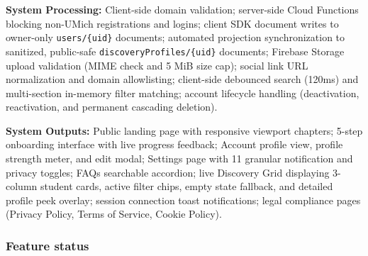 \documentclass[11pt,letterpaper]{article}
\begin{document}
\textbf{System Processing:} Client-side domain validation; server-side Cloud Functions blocking non-UMich registrations and logins; client SDK document writes to owner-only \texttt{users/\{uid\}} documents; automated projection synchronization to sanitized, public-safe \texttt{discoveryProfiles/}\allowbreak\texttt{\{uid\}} documents; Firebase Storage upload validation (MIME check and 5 MiB size cap); social link URL normalization and domain allowlisting; client-side debounced search (120ms) and multi-section in-memory filter matching; account lifecycle handling (deactivation, reactivation, and permanent cascading deletion).

\textbf{System Outputs:} Public landing page with responsive viewport chapters; 5-step onboarding interface with live progress feedback; Account profile view, profile strength meter, and edit modal; Settings page with 11 granular notification and privacy toggles; FAQs searchable accordion; live Discovery Grid displaying 3-column student cards, active filter chips, empty state fallback, and detailed profile peek overlay; session connection toast notifications; legal compliance pages (Privacy Policy, Terms of Service, Cookie Policy).

\subsubsection*{Feature status}
\end{document}
